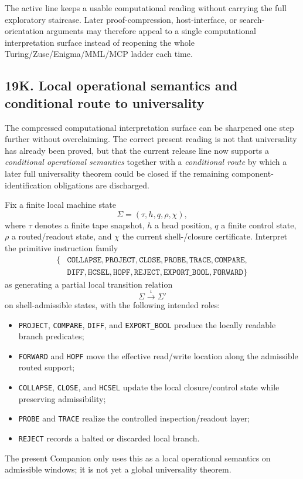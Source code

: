 \begin{corollary}
The active line keeps a usable computational reading without carrying the full exploratory staircase. Later proof-compression, host-interface, or search-orientation arguments may therefore appeal to a single computational interpretation surface instead of reopening the whole Turing/Zuse/Enigma/MML/MCP ladder each time.
\end{corollary}


\subsection*{19K. Local operational semantics and conditional route to universality}
The compressed computational interpretation surface can be sharpened one step further without overclaiming. The correct present reading is not that universality has already been proved, but that the current release line now supports a \emph{conditional operational semantics} together with a \emph{conditional route} by which a later full universality theorem could be closed if the remaining component-identification obligations are discharged.

\begin{definition}
Fix a finite local machine state
\[
\Sigma=(\tau,h,q,\rho,\chi),
\]
where $\tau$ denotes a finite tape snapshot, $h$ a head position, $q$ a finite control state, $\rho$ a routed/readout state, and $\chi$ the current shell-/closure certificate. Interpret the primitive instruction family
\[
\begin{aligned}
\{&\texttt{COLLAPSE},\texttt{PROJECT},\texttt{CLOSE},\texttt{PROBE},\texttt{TRACE},\texttt{COMPARE},\\
&\texttt{DIFF},\texttt{HCSEL},\texttt{HOPF},\texttt{REJECT},\texttt{EXPORT\_BOOL},\texttt{FORWARD}\}
\end{aligned}
\]
as generating a partial local transition relation
\[
\Sigma \xrightarrow{\,\iota\,} \Sigma'
\]
on shell-admissible states, with the following intended roles:
\begin{itemize}[leftmargin=2em]
  \item \texttt{PROJECT}, \texttt{COMPARE}, \texttt{DIFF}, and \texttt{EXPORT\_BOOL} produce the locally readable branch predicates;
  \item \texttt{FORWARD} and \texttt{HOPF} move the effective read/write location along the admissible routed support;
  \item \texttt{COLLAPSE}, \texttt{CLOSE}, and \texttt{HCSEL} update the local closure/control state while preserving admissibility;
  \item \texttt{PROBE} and \texttt{TRACE} realize the controlled inspection/readout layer;
  \item \texttt{REJECT} records a halted or discarded local branch.
\end{itemize}
The present Companion only uses this as a local operational semantics on admissible windows; it is not yet a global universality theorem.
\end{definition}

